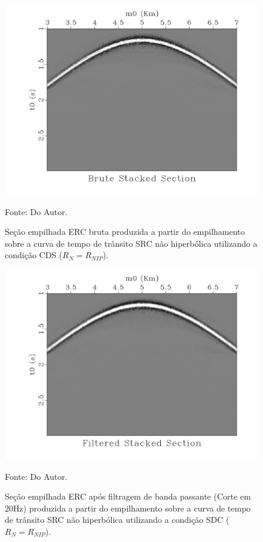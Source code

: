 \begin{figure}
\caption{Seção empilhada ERC bruta produzida a partir do empilhamento sobre a curva de tempo de trânsito SRC não hiperbólica
utilizando a condição CDS ($R_N=R_{NIP}$).}
\begin{center}
\includegraphics[scale=0.4]{images/hugeStackedSection.jpeg}
\vspace{-0.3cm}
\end{center}
\begin{center}
 Fonte: Do Autor.
\end{center}
\label{fig:7.13}
\end{figure}

\begin{figure}
\caption{Seção empilhada ERC após filtragem de banda passante (Corte em 20Hz) produzida a partir do empilhamento 
sobre a curva de tempo de trânsito SRC não hiperbólica
utilizando a condição SDC ($R_N=R_{NIP}$).}
\begin{center}
\includegraphics[scale=0.4]{images/hugeFiltStackedSection.jpeg}
\vspace{-0.3cm}
\end{center}
\begin{center}
 Fonte: Do Autor.
\end{center}
\label{fig:7.14}
\end{figure}